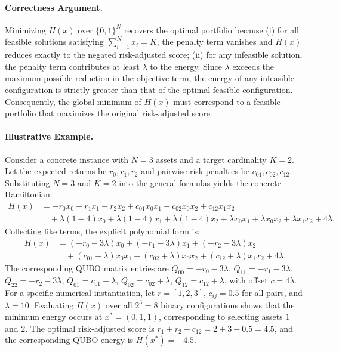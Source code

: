 \documentclass[12pt]{article}
\begin{document}
\paragraph{Correctness Argument.}
Minimizing $H(x)$ over $\{0,1\}^N$ recovers the optimal portfolio because (i) for all feasible solutions satisfying $\sum_{i=1}^N x_i = K$, the penalty term vanishes and $H(x)$ reduces exactly to the negated risk-adjusted score; (ii) for any infeasible solution, the penalty term contributes at least $\lambda$ to the energy. Since $\lambda$ exceeds the maximum possible reduction in the objective term, the energy of any infeasible configuration is strictly greater than that of the optimal feasible configuration. Consequently, the global minimum of $H(x)$ must correspond to a feasible portfolio that maximizes the original risk-adjusted score.

\paragraph{Illustrative Example.}
Consider a concrete instance with $N=3$ assets and a target cardinality $K=2$. Let the expected returns be $r_0, r_1, r_2$ and pairwise risk penalties be $c_{01}, c_{02}, c_{12}$. Substituting $N=3$ and $K=2$ into the general formulas yields the concrete Hamiltonian:
\begin{align}
    H(x) &= -r_0 x_0 - r_1 x_1 - r_2 x_2 + c_{01} x_0 x_1 + c_{02} x_0 x_2 + c_{12} x_1 x_2 \nonumber \\
    &\quad + \lambda(1-4)x_0 + \lambda(1-4)x_1 + \lambda(1-4)x_2 + \lambda x_0 x_1 + \lambda x_0 x_2 + \lambda x_1 x_2 + 4\lambda.
\end{align}
Collecting like terms, the explicit polynomial form is:
\begin{align}
    H(x) &= (-r_0 - 3\lambda)x_0 + (-r_1 - 3\lambda)x_1 + (-r_2 - 3\lambda)x_2 \nonumber \\
    &\quad + (c_{01} + \lambda)x_0 x_1 + (c_{02} + \lambda)x_0 x_2 + (c_{12} + \lambda)x_1 x_2 + 4\lambda.
\end{align}
The corresponding QUBO matrix entries are $Q_{00} = -r_0 - 3\lambda$, $Q_{11} = -r_1 - 3\lambda$, $Q_{22} = -r_2 - 3\lambda$, $Q_{01} = c_{01} + \lambda$, $Q_{02} = c_{02} + \lambda$, $Q_{12} = c_{12} + \lambda$, with offset $c = 4\lambda$. For a specific numerical instantiation, let $r = [1, 2, 3]$, $c_{ij} = 0.5$ for all pairs, and $\lambda = 10$. Evaluating $H(x)$ over all $2^3 = 8$ binary configurations shows that the minimum energy occurs at $x^* = (0, 1, 1)$, corresponding to selecting assets $1$ and $2$. The optimal risk-adjusted score is $r_1 + r_2 - c_{12} = 2 + 3 - 0.5 = 4.5$, and the corresponding QUBO energy is $H(x^*) = -4.5$.
\end{document}
